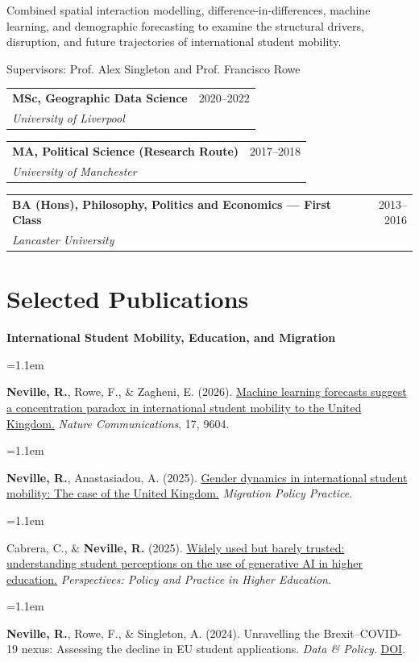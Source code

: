 \documentclass[a4paper,10.5pt]{article}
\makeatletter
\newcommand{\compactentry}[3]{%
  \vspace{3pt}
  \begin{tabular*}{\textwidth}
    {@{}p{0.80\textwidth}@{\extracolsep{\fill}}r@{}}
    {\small\textbf{#1}} &
    {\small\color{mutedtext} #3} \\[-0.5pt]
    {\small\textit{#2}} &
  \end{tabular*}
  \vspace{0.5pt}
}
\newcommand{\subhead}[1]{%
  \vspace{4pt}
  {\small\bfseries #1\par}
  \vspace{1.5pt}
}
\newcommand{\pubitem}[1]{%
  \vspace{2.2pt}
  {\small
    \hangindent=1.1em
    \hangafter=1
    #1\par
  }
}
\makeatother
\begin{document}
{\small
Combined spatial interaction modelling, difference-in-differences,
machine learning, and demographic forecasting to examine the structural
drivers, disruption, and future trajectories of international student mobility.
}

\vspace{1.5pt}

{\small\color{mutedtext}
Supervisors: Prof. Alex Singleton and Prof. Francisco Rowe
}

\compactentry
{MSc, Geographic Data Science}
{University of Liverpool}
{2020--2022}

\compactentry
{MA, Political Science (Research Route)}
{University of Manchester}
{2017--2018}

\compactentry
{BA (Hons), Philosophy, Politics and Economics --- First Class}
{Lancaster University}
{2013--2016}

\section{Selected Publications}

\subhead{International Student Mobility, Education, and Migration}

\pubitem{
\textbf{Neville, R.}, Rowe, F., \& Zagheni, E. (2026).
\href{https://doi.org/10.1038/s41467-026-77425-z}{Machine learning forecasts suggest a concentration paradox in international
student mobility to the United Kingdom.}
\textit{Nature Communications}, 17, 9604.
}

\pubitem{
\textbf{Neville, R.}, Anastasiadou, A. (2025).
\href{https://publications.iom.int/books/migration-policy-practice-volume-xiv-number-3-september-2025}{Gender dynamics in international student mobility: The case of the United Kingdom.}
\textit{Migration Policy Practice}.
}

\pubitem{
Cabrera, C., \& \textbf{Neville, R.} (2025).
\href{https://doi.org/10.1080/13603108.2025.2595453}{Widely used but barely trusted: understanding student perceptions on the use of generative AI in higher education.}
\textit{Perspectives: Policy and Practice in Higher Education}.
}

\pubitem{
\textbf{Neville, R.}, Rowe, F., \& Singleton, A. (2024).
Unravelling the Brexit--COVID-19 nexus: Assessing the decline in EU student applications.
\textit{Data \& Policy}.
\href{https://doi.org/10.1017/dap.2024.42}{DOI}.
}
\end{document}

